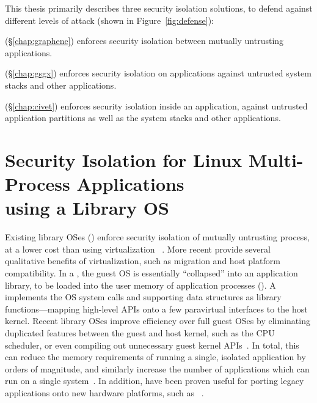 This thesis primarily describes three security isolation solutions,
to defend against different levels of attack (shown in Figure~\ref{fig:defense}):
\begin{compactitem}
\item {\em \graphene{}} (\S\ref{chap:graphene}) enforces security isolation between mutually untrusting applications.
\item {\em \gsgx{}} (\S\ref{chap:gsgx}) enforces security isolation on applications against untrusted system stacks and other applications.
\item {\em \civet{}} (\S\ref{chap:civet}) enforces security isolation inside an application, against untrusted application partitions as well as the system stacks and other applications.
\end{compactitem}

\section{Security Isolation for Linux Multi-Process Applications\\ using a Library OS}
\label{sec:intro:graphene}

Existing library OSes (\libos{}) enforce security isolation of mutually untrusting process,
at a lower cost than using virtualization
~\citep{porter11drawbridge,unikernels,baumann13bascule}.
More recent \liboses{}
provide several qualitative benefits of virtualization,
such as migration and host platform compatibility.
In a \libos{}, the guest OS is essentially ``collapsed''
into an application library, to be loaded into the user memory of application processes ({\em \picoprocs{}}).
A \libos{} implements the OS system calls and supporting data structures as library functions---mapping
high-level APIs onto
a few paravirtual interfaces to the host kernel.
Recent library OSes improve efficiency over full guest OSes by eliminating duplicated features
between the guest and host kernel,
such as the CPU scheduler, or
even compiling out unnecessary guest kernel APIs~\citep{unikernels}.
In total, this can reduce the memory requirements of running a single, isolated application
by orders of magnitude, and similarly
increase the number of applications which can run
on a single system~\citep{porter11drawbridge,unikernels}.
In addition, \liboses{} have been proven
useful for porting legacy applications
onto new hardware platforms, such as \intel{} \sgx{}~\citep{baumann14haven}.

